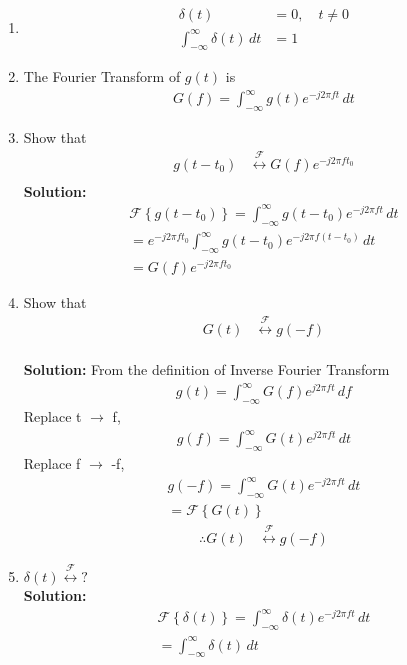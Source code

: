 \documentclass[journal,12pt,twocolumn]{IEEEtran}
\newcommand{\solution}{\noindent \textbf{Solution: }}
\providecommand{\brak}[1]{\ensuremath{\left(#1\right)}}
\providecommand{\cbrak}[1]{\ensuremath{\left\{#1\right\}}}
\providecommand{\foutranin}[1]{\mathcal{F}\cbrak{#1}}
\providecommand{\foutranfin}[1]{\int_{-\infty}^{\infty}{#1}e^{-j2\pi ft}\,dt}
\providecommand{\system}[1]{\overset{\mathcal{#1}}{ \longleftrightarrow}}
\numberwithin{equation}{section}
\renewcommand\thesection{\arabic{section}}
\begin{document}
\begin{enumerate}[label=\thesection.\arabic*
,ref=\thesection.\theenumi]
\item 
	\begin{align}
		\delta(t)&=0, \quad t\neq0
\\
		\int_{-\infty}^{\infty}\delta(t) \, dt&= 1
	\end{align}
 \item The Fourier Transform of $g(t)$ is
 \begin{align}
 \label{eq:foutraneq}
 G(f)=\int_{-\infty}^{\infty}g(t)e^{-j2\pi ft}\,dt
 \end{align}
 \item Show that 
 \begin{align}
	 g(t-t_0)&\system{F}G(f)e^{-j2\pi ft_0}\\
 \end{align}
 \solution 
 \begin{align}
 \mathcal{F}\cbrak{g(t-t_0)}=\int_{-\infty}^{\infty}g(t-t_0)e^{-j2\pi ft}\,dt\\
 =e^{-j2\pi ft_0}\int_{-\infty}^{\infty}g(t-t_0)e^{-j2\pi f\brak{t-t_0}}\,dt\\
=G(f)e^{-j2\pi ft_0}
 \end{align}
 \item Show that 
 \begin{align}
 \label{eq:duality}
	 G(t)&\system{F}g(-f)
 \end{align}\\
 \solution From the definition of Inverse Fourier Transform
 \begin{align}
 g(t)=\int_{-\infty}^{\infty}G(f)e^{j2\pi ft}\,df
 \end{align}
 Replace t $\to$ f,
 \begin{align}
  g(f)=\int_{-\infty}^{\infty}G(t)e^{j2\pi ft}\,dt
  \end{align}
  Replace f $\to$ -f,
  \begin{align}
   g(-f)=\int_{-\infty}^{\infty}G(t)e^{-j2\pi ft}\,dt\\
    =\mathcal{F}\cbrak{G(t)}
  \end{align}
  \begin{align}
  \therefore  G(t)&\system{F}g(-f)
 \end{align}
 \item $\delta(t)\system{F}?$\\
 \solution
 \begin{align}
 \foutranin{\delta(t)}=\foutranfin{\delta(t)}\\
 =\int_{-\infty}^{\infty}\delta(t)\,dt\\

\end{align}
\end{enumerate}
\end{document}
